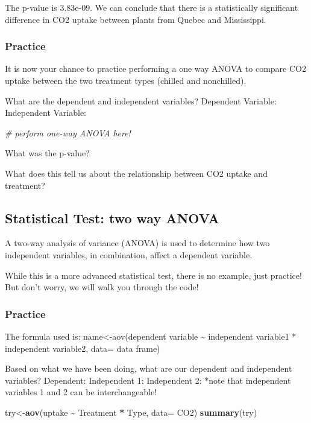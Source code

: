 \documentclass[
]{article}
\newenvironment{Shaded}{\begin{snugshade}}{\end{snugshade}}
\newcommand{\AttributeTok}[1]{\textcolor[rgb]{0.13,0.29,0.53}{#1}}
\newcommand{\CommentTok}[1]{\textcolor[rgb]{0.56,0.35,0.01}{\textit{#1}}}
\newcommand{\FunctionTok}[1]{\textcolor[rgb]{0.13,0.29,0.53}{\textbf{#1}}}
\newcommand{\NormalTok}[1]{#1}
\newcommand{\OtherTok}[1]{\textcolor[rgb]{0.56,0.35,0.01}{#1}}
\newcommand{\SpecialCharTok}[1]{\textcolor[rgb]{0.81,0.36,0.00}{\textbf{#1}}}
\begin{document}
The p-value is 3.83e-09. We can conclude that there is a statistically
significant difference in CO2 uptake between plants from Quebec and
Mississippi.

\subsubsection{Practice}\label{practice-2}

It is now your chance to practice performing a one way ANOVA to compare
CO2 uptake between the two treatment types (chilled and nonchilled).

What are the dependent and independent variables? Dependent Variable:
Independent Variable:

\begin{Shaded}
\begin{Highlighting}[]
\CommentTok{\# perform one{-}way ANOVA here!}
\end{Highlighting}
\end{Shaded}

What was the p-value?

What does this tell us about the relationship between CO2 uptake and
treatment?

\subsection{Statistical Test: two way
ANOVA}\label{statistical-test-two-way-anova}

A two-way analysis of variance (ANOVA) is used to determine how two
independent variables, in combination, affect a dependent variable.

While this is a more advanced statistical test, there is no example,
just practice! But don't worry, we will walk you through the code!

\subsubsection{Practice}\label{practice-3}

The formula used is: name\textless-aov(dependent variable
\textasciitilde{} independent variable1 * independent variable2, data=
data frame)

Based on what we have been doing, what are our dependent and independent
variables? Dependent: Independent 1: Independent 2: *note that
independent variables 1 and 2 can be interchangeable!

\begin{Shaded}
\begin{Highlighting}[]
\NormalTok{try}\OtherTok{\textless{}{-}}\FunctionTok{aov}\NormalTok{(uptake }\SpecialCharTok{\textasciitilde{}}\NormalTok{ Treatment }\SpecialCharTok{*}\NormalTok{ Type, }\AttributeTok{data=}\NormalTok{ CO2)}
\FunctionTok{summary}\NormalTok{(try)}
\end{Highlighting}
\end{Shaded}
\end{document}
